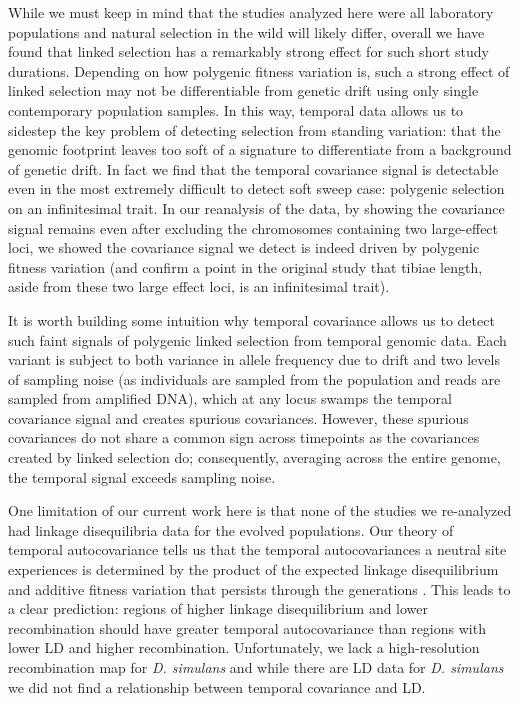 \documentclass[11pt]{article}
\newcommand{\graham}[1]{\todo[size=\scriptsize, color=red!50]{#1}}
\begin{document}
While we must keep in mind that the studies analyzed here were all laboratory
populations and natural selection in the wild will likely differ, overall we
have found that linked selection has a remarkably strong effect for such short
study durations. Depending on how polygenic fitness variation is, such a strong
effect of linked selection may not be differentiable from genetic drift using
only single contemporary population samples. In this way, temporal data allows
us to sidestep the key problem of detecting selection from standing variation:
that the genomic footprint leaves too soft of a signature to differentiate from
a background of genetic drift. In fact we find that the temporal covariance
signal is detectable even in the most extremely difficult to detect soft sweep
case: polygenic selection on an infinitesimal trait. In our reanalysis of the
\textcite{Castro2019-uk} data, by showing the covariance signal remains even
after excluding the chromosomes containing two large-effect loci, we showed the
covariance signal we detect is indeed driven by polygenic fitness variation
(and confirm a point in the original study that tibiae length, aside from these
two large effect loci, is an infinitesimal trait). 

It is worth building some intuition why temporal covariance allows us to detect
such faint signals of polygenic linked selection from temporal genomic data.
Each variant is subject to both variance in allele frequency due to drift and
two levels of sampling noise (as individuals are sampled from the population
and reads are sampled from amplified DNA), which at any locus swamps the
temporal covariance signal and creates spurious covariances. However, these
spurious covariances do not share a common sign across timepoints as the
covariances created by linked selection do; consequently, averaging across the
entire genome, the temporal signal exceeds sampling noise.

One limitation of our current work here is that none of the studies we
re-analyzed had linkage disequilibria data for the evolved populations. Our
theory of temporal autocovariance tells us that the temporal autocovariances a
neutral site experiences is determined by the product of the expected linkage
disequilibrium and additive fitness variation that persists through the
generations \parencite{Buffalo2019-ion}. This leads to a clear prediction:
regions of higher linkage disequilibrium and lower recombination should have
greater temporal autocovariance than regions with lower LD and higher
recombination. Unfortunately, we lack a high-resolution recombination map for
\emph{D. simulans} and while there are LD data for \emph{D. simulans}
\parencite{Signor2018-wg} we did not find a relationship between temporal
covariance and LD. \graham{Is important point. We'll likely need plots for
supp}
\end{document}
